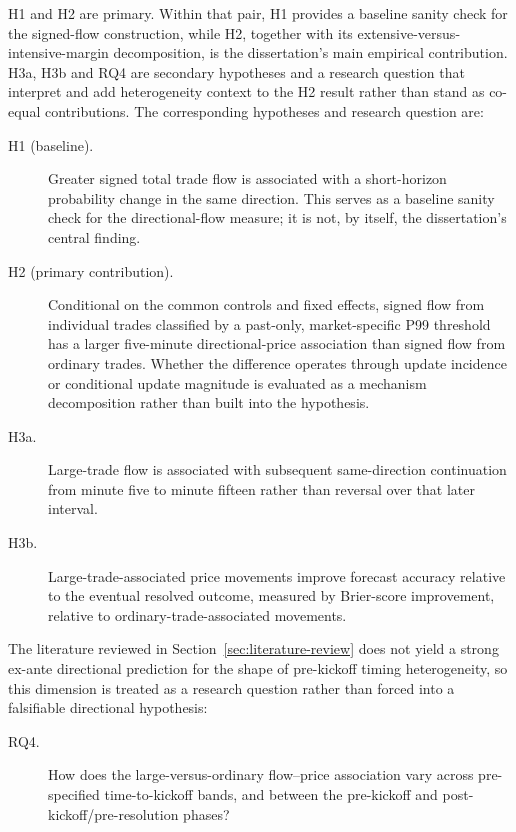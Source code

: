 H1 and H2 are primary. Within that pair, H1 provides a baseline sanity check for the signed-flow construction, while H2, together with its extensive-versus-intensive-margin decomposition, is the dissertation's main empirical contribution. H3a, H3b and RQ4 are secondary hypotheses and a research question that interpret and add heterogeneity context to the H2 result rather than stand as co-equal contributions. The corresponding hypotheses and research question are:

\begin{description}
  \item[H1 (baseline).] Greater signed total trade flow is associated with a short-horizon probability change in the same direction. This serves as a baseline sanity check for the directional-flow measure; it is not, by itself, the dissertation's central finding.
  \item[H2 (primary contribution).] Conditional on the common controls and fixed effects, signed flow from individual trades classified by a past-only, market-specific P99 threshold has a larger five-minute directional-price association than signed flow from ordinary trades. Whether the difference operates through update incidence or conditional update magnitude is evaluated as a mechanism decomposition rather than built into the hypothesis.
  \item[H3a.] Large-trade flow is associated with subsequent same-direction continuation from minute five to minute fifteen rather than reversal over that later interval.
  \item[H3b.] Large-trade-associated price movements improve forecast accuracy relative to the eventual resolved outcome, measured by Brier-score improvement, relative to ordinary-trade-associated movements.
\end{description}

The literature reviewed in Section~\ref{sec:literature-review} does not yield a strong ex-ante directional prediction for the shape of pre-kickoff timing heterogeneity, so this dimension is treated as a research question rather than forced into a falsifiable directional hypothesis:

\begin{description}
  \item[RQ4.] How does the large-versus-ordinary flow--price association vary across pre-specified time-to-kickoff bands, and between the pre-kickoff and post-kickoff/pre-resolution phases?
\end{description}

